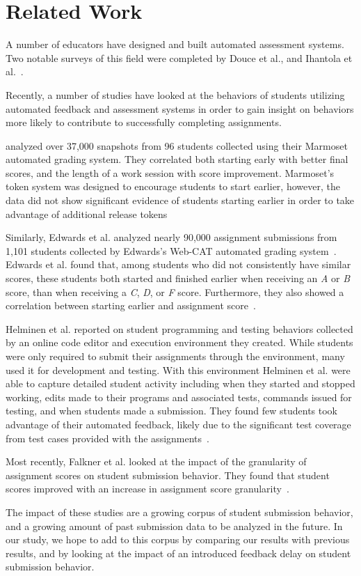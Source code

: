 \section{Related Work}

A number of educators have designed and built automated assessment systems. Two
notable surveys of this field were completed by Douce et al., and Ihantola et
al.~\cite{Douce:2005:ATA:1163405.1163409, Ihantola:2010:RRS:1930464.1930480}.

Recently, a number of studies have looked at the behaviors of students
utilizing automated feedback and assessment systems in order to gain insight on
behaviors more likely to contribute to successfully completing assignments.

\spacco{} analyzed over 37,000 snapshots from 96 students collected using their
Marmoset automated grading system. They correlated both starting early with
better final scores, and the length of a work session with score
improvement. Marmoset's token system was designed to encourage students to
start earlier, however, the data did not show significant evidence of students
starting earlier in order to take advantage of additional release
tokens~\cite{Spacco:2013:TIP:2462476.2465594, Spacco:2006:EMD:1140124.1140131}

Similarly, Edwards et al. analyzed nearly 90,000 assignment submissions from
1,101 students collected by Edwards's Web-CAT automated grading
system~\cite{Edwards:2003:RCS:949344.949390}. Edwards et al. found that, among
students who did not consistently have similar scores, these students both
started and finished earlier when receiving an \emph{A} or \emph{B} score, than
when receiving a \emph{C}, \emph{D}, or \emph{F} score. Furthermore, they also
showed a correlation between starting earlier and assignment
score~\cite{Edwards:2009:CEI:1584322.1584325}.

Helminen et al. reported on student programming and testing behaviors collected
by an online code editor and execution environment they created. While students
were only required to submit their assignments through the environment, many
used it for development and testing. With this environment Helminen et al. were
able to capture detailed student activity including when they started and
stopped working, edits made to their programs and associated tests, commands
issued for testing, and when students made a submission.  They found few
students took advantage of their automated feedback, likely due to the
significant test coverage from test cases provided with the
assignments~\cite{Helminen:2013:RAI:2526968.2526970}.

Most recently, Falkner et al. looked at the impact of the granularity of
assignment scores on student submission behavior. They found that student
scores improved with an increase in assignment score
granularity~\cite{Falkner:2014:IEA:2538862.2538896}.

The impact of these studies are a growing corpus of student submission
behavior, and a growing amount of past submission data to be analyzed in the
future. In our study, we hope to add to this corpus by comparing our results
with previous results, and by looking at the impact of an introduced feedback
delay on student submission behavior.
